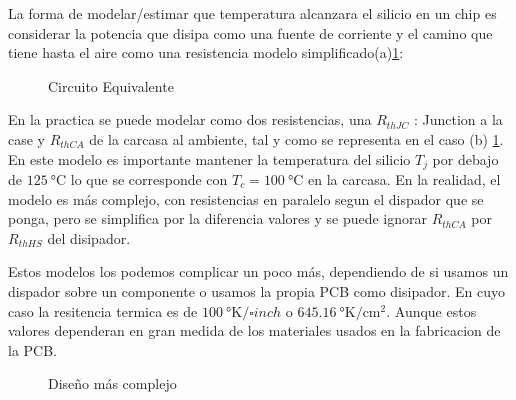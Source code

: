 
La forma de modelar/estimar que temperatura alcanzara el silicio en un chip es considerar
la potencia que disipa como una fuente de corriente y el camino que tiene hasta el aire como
una resistencia modelo simplificado(a)\ref{fig:ThermalEquivalent}:

\begin{figure}[H]
    \centering
    
    \caption{Circuito Equivalente}
    \label{fig:ThermalEquivalent}
\end{figure}

En la practica se puede modelar como dos resistencias, una $R_{thJC}$ :
Junction a la case y $R_{thCA}$ de la 
carcasa al ambiente, tal y como se representa en el caso (b) \ref{fig:ThermalEquivalent}.
En este modelo es importante mantener la temperatura del silicio $T_j$ por debajo de
$\SI{125}{\celsius}$ lo que se corresponde con $T_c=\SI{100}{\celsius}$ en la carcasa.
En la realidad, el modelo es más complejo, con resistencias en paralelo segun el dispador
que se ponga, pero se simplifica por la diferencia valores y se puede ignorar $R_{thCA}$
por $R_{thHS}$ del disipador.

Estos modelos los podemos complicar un poco más, dependiendo de si usamos un dispador sobre un componente o 
usamos la propia PCB como disipador. En cuyo caso la resitencia termica es
de $\SI{100}{\degree\kelvin/\square{inch}}$ o $\SI{645.16}{\degree\kelvin/\square\cm}$.
Aunque estos valores dependeran en gran medida de los materiales usados en la 
fabricacion de la PCB.


\begin{figure}[H]
    \centering
    
    \caption{Diseño más complejo}
    \label{fig:ThermalEquivFull}
\end{figure}

